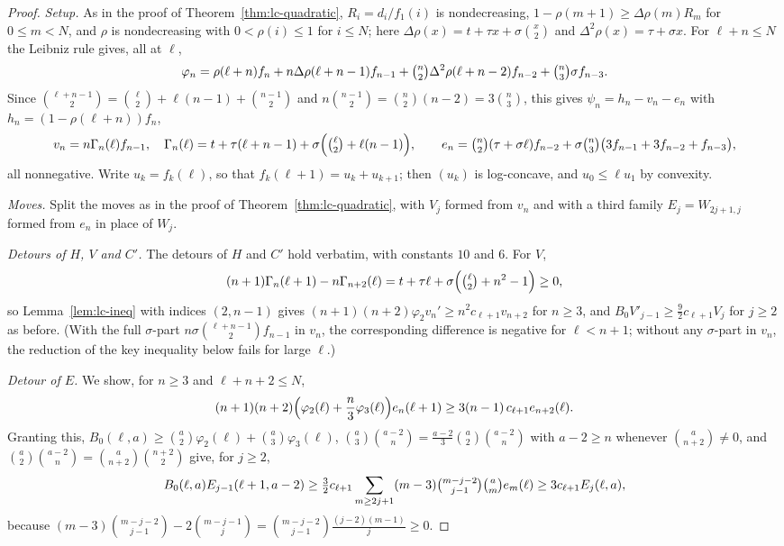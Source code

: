 \documentclass[twoside,10pt]{article}
\numberwithin{equation}{section}
\theoremstyle{slbody}
\theoremstyle{definition}
\theoremstyle{remark}
\begin{document}
\begin{proof}
\emph{Setup.} As in the proof of Theorem~\ref{thm:lc-quadratic}, $R_i=d_i/f_1(i)$ is nondecreasing, $1-\rho(m+1)\geq\Delta\rho(m)R_m$ for $0\leq m<N$, and $\rho$ is nondecreasing with $0<\rho(i)\leq1$ for $i\leq N$; here $\Delta\rho(x)=t+\tau x+\sigma\binom x2$ and $\Delta^2\rho(x)=\tau+\sigma x$. For $\ell+n\leq N$ the Leibniz rule gives, all at $\ell$,
\[
\varphi_n=\rho(\ell+n)f_n+n\Delta\rho(\ell+n-1)f_{n-1}+\tbinom n2\Delta^2\rho(\ell+n-2)f_{n-2}+\tbinom n3\sigma f_{n-3}.
\]
Since $\binom{\ell+n-1}2=\binom\ell2+\ell(n-1)+\binom{n-1}2$ and $n\binom{n-1}2=\binom n2(n-2)=3\binom n3$, this gives $\psi_n=h_n-v_n-e_n$ with $h_n=(1-\rho(\ell+n))f_n$,
\[
v_n=n\Gamma_n(\ell)f_{n-1},\quad\Gamma_n(\ell)=t+\tau(\ell+n-1)+\sigma\Bigl(\tbinom\ell2+\ell(n-1)\Bigr),\qquad e_n=\tbinom n2(\tau+\sigma\ell)f_{n-2}+\sigma\tbinom n3\bigl(3f_{n-1}+3f_{n-2}+f_{n-3}\bigr),
\]
all nonnegative. Write $u_k=f_k(\ell)$, so that $f_k(\ell+1)=u_k+u_{k+1}$; then $(u_k)$ is log-concave, and $u_0\leq\ell u_1$ by convexity.

\emph{Moves.} Split the moves as in the proof of Theorem~\ref{thm:lc-quadratic}, with $V_j$ formed from $v_n$ and with a third family $E_j=W_{2j+1,j}$ formed from $e_n$ in place of $W_j$.

\emph{Detours of $H$, $V$ and $C'$.} The detours of $H$ and $C'$ hold verbatim, with constants $10$ and $6$. For $V$,
\[
(n+1)\Gamma_n(\ell+1)-n\Gamma_{n+2}(\ell)=t+\tau\ell+\sigma\Bigl(\tbinom\ell2+n^2-1\Bigr)\geq0,
\]
so Lemma~\ref{lem:lc-ineq} with indices $(2,n-1)$ gives $(n+1)(n+2)\varphi_2v_n'\geq n^2c_{\ell+1}v_{n+2}$ for $n\geq3$, and $B_0V'_{j-1}\geq\frac92c_{\ell+1}V_j$ for $j\geq2$ as before. (With the full $\sigma$-part $n\sigma\binom{\ell+n-1}2f_{n-1}$ in $v_n$, the corresponding difference is negative for $\ell<n+1$; without any $\sigma$-part in $v_n$, the reduction of the key inequality below fails for large $\ell$.)

\emph{Detour of $E$.} We show, for $n\geq3$ and $\ell+n+2\leq N$,
\begin{equation}\label{eq:cubic-E}
(n+1)(n+2)\Bigl(\varphi_2(\ell)+\frac n3\varphi_3(\ell)\Bigr)e_n(\ell+1)\geq3(n-1)\,c_{\ell+1}e_{n+2}(\ell).
\end{equation}
Granting this, $B_0(\ell,a)\geq\binom a2\varphi_2(\ell)+\binom a3\varphi_3(\ell)$, $\binom a3\binom{a-2}n=\frac{a-2}3\binom a2\binom{a-2}n$ with $a-2\geq n$ whenever $\binom a{n+2}\neq0$, and $\binom a2\binom{a-2}n=\binom a{n+2}\binom{n+2}2$ give, for $j\geq2$,
\[
B_0(\ell,a)E_{j-1}(\ell+1,a-2)\geq\tfrac32c_{\ell+1}\sum_{m\geq2j+1}(m-3)\tbinom{m-j-2}{j-1}\tbinom am e_m(\ell)\geq3c_{\ell+1}E_j(\ell,a),
\]
because $(m-3)\binom{m-j-2}{j-1}-2\binom{m-j-1}j=\binom{m-j-2}{j-1}\frac{(j-2)(m-1)}j\geq0$.


\end{proof}
\end{document}
